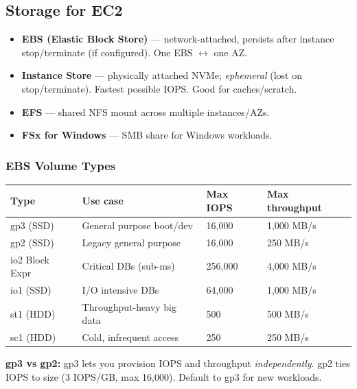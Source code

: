 \subsection{Storage for EC2}

\begin{keyfacts}
\begin{itemize}
  \item \textbf{EBS (Elastic Block Store)} — network-attached, persists after
        instance stop/terminate (if configured). One EBS $\leftrightarrow$ one AZ.
  \item \textbf{Instance Store} — physically attached NVMe; \emph{ephemeral}
        (lost on stop/terminate). Fastest possible IOPS. Good for caches/scratch.
  \item \textbf{EFS} — shared NFS mount across multiple instances/AZs.
  \item \textbf{FSx for Windows} — SMB share for Windows workloads.
\end{itemize}
\end{keyfacts}

\subsubsection{EBS Volume Types}
\begin{comparebox}[title={EBS types}]
\begin{tabular}{@{}llll@{}}
\toprule
\textbf{Type}  & \textbf{Use case}          & \textbf{Max IOPS} & \textbf{Max throughput} \\
\midrule
gp3 (SSD)      & General purpose boot/dev   & 16,000            & 1,000 MB/s \\
gp2 (SSD)      & Legacy general purpose     & 16,000            & 250 MB/s   \\
io2 Block Expr & Critical DBs (sub-ms)      & 256,000           & 4,000 MB/s \\
io1 (SSD)      & I/O intensive DBs          & 64,000            & 1,000 MB/s \\
st1 (HDD)      & Throughput-heavy big data  & 500               & 500 MB/s   \\
sc1 (HDD)      & Cold, infrequent access    & 250               & 250 MB/s   \\
\bottomrule
\end{tabular}
\end{comparebox}

\begin{examtip}
\textbf{gp3 vs gp2:} gp3 lets you provision IOPS and throughput \emph{independently}.
gp2 ties IOPS to size (3 IOPS/GB, max 16,000). Default to gp3 for new workloads.
\end{examtip}

